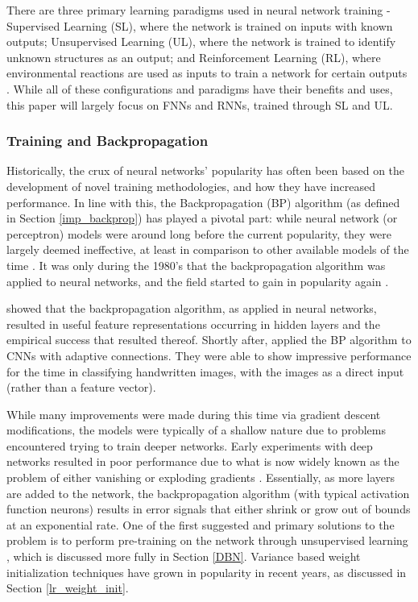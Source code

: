 \documentclass[a4paper,11pt,oneside]{article}
\theoremstyle{plain}
\theoremstyle{definition}
\begin{document}
	There are three primary learning paradigms used in neural network training - Supervised Learning (SL), 
	where the network is trained on inputs with known outputs; Unsupervised Learning (UL), where the network is 
	trained to identify unknown structures as an output; and Reinforcement Learning (RL), where environmental
	reactions are used as inputs to train a network for certain outputs \citep{Schmidhuber}. While all of these configurations and paradigms 
	have their benefits and uses, this paper will largely focus on FNNs and RNNs, trained through SL and UL.
	\hfill \break 
	
	\subsubsection{Training and Backpropagation}\label{lr_trainingbackprop}
	
	Historically, the crux of neural networks' popularity has often been based on the development of novel training 
	methodologies, and how they have increased performance. In line with this, the Backpropagation (BP) algorithm (as defined in Section \ref{imp_backprop})
	has played a pivotal part: while neural network (or perceptron) models were around long before the current popularity, 
	they were largely deemed ineffective, at least in comparison to other available models of the time 
	\citep{Minksy}. It was only during the 1980’s that the backpropagation algorithm was applied to neural networks, and 
	the field started to gain in popularity again \citep{LeCun2, Werbos2}. 
	\hfill \break 
	
	\citet{Rumelhart} showed that the backpropagation algorithm, as applied in neural networks, resulted in useful feature representations 
	occurring in hidden layers and the empirical success that resulted thereof.  
	Shortly after, \citet{LeCun3} applied the BP algorithm to CNNs with adaptive connections. They were able to show 
	impressive performance for the time in classifying handwritten images, with the images as a direct input (rather than a feature vector).
	\hfill \break 
	
	While many improvements were made during this time via gradient descent modifications, the 
	models were typically of a shallow nature due to problems encountered trying to train deeper networks. 
	Early experiments with deep networks resulted in poor performance due to what is now widely known as the problem 
	of either vanishing or exploding gradients \citep{Pascanu}. Essentially, as more layers are added to the network, the backpropagation 
	algorithm (with typical activation function neurons) results in error signals that either shrink or grow out of bounds at an 
	exponential rate. One of the first suggested and primary solutions to the problem is to perform pre-training on the 
	network through unsupervised learning  \citep{Schmidhuber}, which is discussed more fully in Section \ref{DBN}. Variance based 
	weight initialization techniques have grown in popularity in recent years, as discussed in Section \ref{lr_weight_init}.
	\hfill \break 
	
\end{document}
